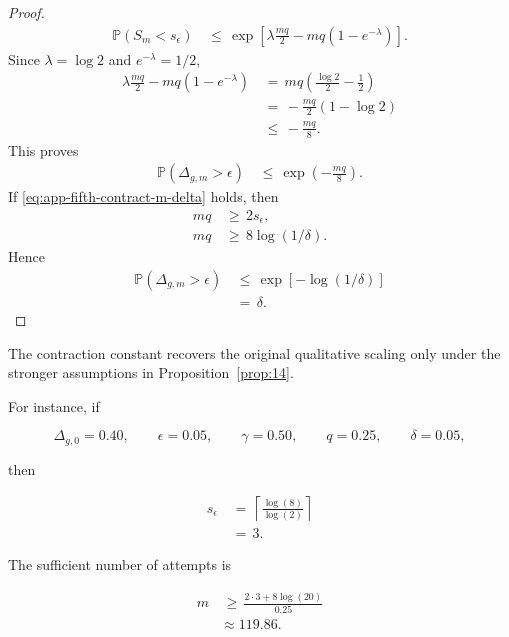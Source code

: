 \documentclass{article} %
\begin{document}
\begin{proof}
\begin{align}
\mathbb{P}(S_m<s_\epsilon)
&\,\le\,
\exp\!\left[
\lambda\frac{mq}{2}
-
mq(1-e^{-\lambda})
\right].
\end{align}
Since \(\lambda=\log 2\) and \(e^{-\lambda}=1/2\),
\begin{align}
\label{eq:app-fifth-contract-proof-constant}
\lambda\frac{mq}{2}
-
mq(1-e^{-\lambda})
&\,=\,
mq\left(
\frac{\log 2}{2}
-
\frac{1}{2}
\right)
\\
&\,=\,
-\frac{mq}{2}(1-\log 2)
\\
&\,\le\,
-\frac{mq}{8}.
\end{align}
This proves
\begin{align}
\label{eq:app-fifth-contract-proof-final-tail}
\mathbb{P}(\Delta_{g,m}>\epsilon)
&\,\le\,
\exp\!\left(-\frac{mq}{8}\right).
\end{align}
If \eqref{eq:app-fifth-contract-m-delta} holds, then
\begin{align}
\label{eq:app-fifth-contract-proof-delta-conditions}
mq
&\,\ge\,
2s_\epsilon,
\\
mq
&\,\ge\,
8\log(1/\delta).
\end{align}
Hence
\begin{align}
\label{eq:app-fifth-contract-proof-delta}
\mathbb{P}(\Delta_{g,m}>\epsilon)
&\,\le\,
\exp[-\log(1/\delta)]
\\
&\,=\,
\delta.
\end{align}
\end{proof}

The contraction constant recovers the original qualitative scaling only under the stronger assumptions in Proposition~\ref{prop:14}.

For instance, if

\begin{equation}
\label{eq:app-fifth-contract-example-params}
\Delta_{g,0}=0.40,
\qquad
\epsilon=0.05,
\qquad
\gamma=0.50,
\qquad
q=0.25,
\qquad
\delta=0.05,
\end{equation}

then

\begin{align}
\label{eq:app-fifth-contract-example-s}
s_\epsilon
&\,=\,
\left\lceil
\frac{\log(8)}{\log(2)}
\right\rceil
\\
&\,=\,
3.
\end{align}

The sufficient number of attempts is

\begin{align}
\label{eq:app-fifth-contract-example-m}
m
&\,\ge\,
\frac{2\cdot 3+8\log(20)}{0.25}
\\
&\approx
119.86.
\end{align}
\end{document}
